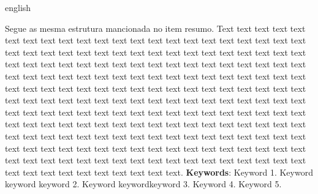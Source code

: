 \documentclass[
	12pt,				%
	openright,			%
	twoside,			%
	a4paper,			%
	chapter=TITLE,		%
	sumario=abnt-6027-2012,
	english,			%
	brazil				%
	]{UFVJM-abntex2}
\begin{document}
\begin{resumo}[ABSTRACT]
 \begin{otherlanguage*}{english}
   \noindent 

   \vspace{\onelineskip}

   \noindent Segue as mesma estrutura mancionada no item resumo. Text text text text text text text text text text text text text text text text text text text text text text text text text text text text text text text text text text text text text text text text text text text text text text text text text text text text text text text text text text text text text text text text text text text text text text text text text text text text text text text text text text text text text text text text text text text text text text text text text text text text text text text text text text text text text text text text text text text text text text text text text text text text text text text text text text text text text text text text text text text text text text text text text text text text text text text text text text text text text text text text text text text text text text text text text text text text text text text text text text text text text text text text text text text text text text text text text text text text text text text text text text.
   \textbf{Keywords}: Keyword 1. Keyword keyword keyword 2. Keyword keywordkeyword 3. Keyword 4. Keyword 5. 
 \end{otherlanguage*}
\end{resumo}
\vfill

% 

%  

\listoffigures*
\cleardoublepage
\end{document}
